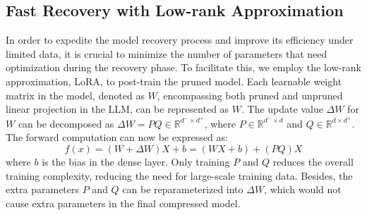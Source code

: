 \documentclass{article}
\begin{document}

\subsection{Fast Recovery with Low-rank Approximation} \label{sec:recovery}
In order to expedite the model recovery process and improve its efficiency under limited data, it is crucial to minimize the number of parameters that need optimization during the recovery phase. To facilitate this, we employ the low-rank approximation,  LoRA\cite{hulora}, to post-train the pruned model. Each learnable weight matrix in the model, denoted as $W$, encompassing both pruned and unpruned linear projection in the LLM, can be represented as $W$. The update value $\Delta W$ for $W$ can be decomposed as $\Delta W = PQ \in \mathbb{R}^{d^- \times d^+}$, where $P \in \mathbb{R}^{d^- \times d}$ and $Q \in \mathbb{R}^{d \times d^+}$. The forward computation can now be expressed as:
\begin{equation}
    f(x) = (W+\Delta W)X + b = (WX + b) + (PQ)X
\end{equation}
where $b$ is the bias in the dense layer. Only training $P$ and $Q$ reduces the overall training complexity, reducing the need for large-scale training data. Besides, the extra parameters $P$ and $Q$ can be reparameterized into $\Delta W$, which would not cause extra parameters in the final compressed model. 
\end{document}
